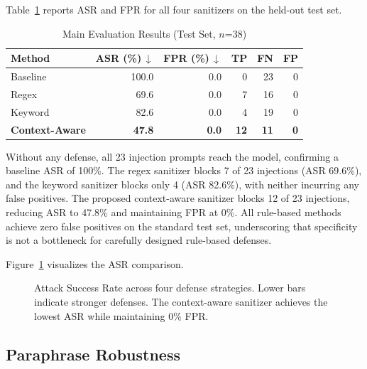 \documentclass[10pt,conference]{IEEEtran}
\begin{document}
Table~\ref{tab:main_results} reports ASR and FPR for all four
sanitizers on the held-out test set.

\begin{table}[t]
\caption{Main Evaluation Results (Test Set, $n$=38)}
\label{tab:main_results}
\centering
\begin{tabular}{lrrrrr}
\toprule
Method & ASR (\%)\,$\downarrow$ & FPR (\%)\,$\downarrow$
       & TP & FN & FP \\
\midrule
Baseline       & 100.0 & 0.0 &  0 & 23 & 0 \\
Regex          &  69.6 & 0.0 &  7 & 16 & 0 \\
Keyword        &  82.6 & 0.0 &  4 & 19 & 0 \\
\textbf{Context-Aware} & \textbf{47.8} & \textbf{0.0}
               & \textbf{12} & \textbf{11} & \textbf{0} \\
\bottomrule
\end{tabular}
\end{table}

Without any defense, all 23 injection prompts reach the model,
confirming a baseline ASR of 100\%.
The regex sanitizer blocks 7 of 23 injections (ASR 69.6\%), and the
keyword sanitizer blocks only 4 (ASR 82.6\%), with neither incurring
any false positives.
The proposed context-aware sanitizer blocks 12 of 23 injections,
reducing ASR to 47.8\% and maintaining FPR at 0\%.
All rule-based methods achieve zero false positives on the standard
test set, underscoring that specificity is not a bottleneck for
carefully designed rule-based defenses.

Figure~\ref{fig:asr} visualizes the ASR comparison.

\begin{figure}[t]
  \centering
  \caption{Attack Success Rate across four defense strategies.
           Lower bars indicate stronger defenses.
           The context-aware sanitizer achieves the lowest ASR
           while maintaining 0\% FPR.}
  \label{fig:asr}
\end{figure}

\subsection{Paraphrase Robustness}
\end{document}
